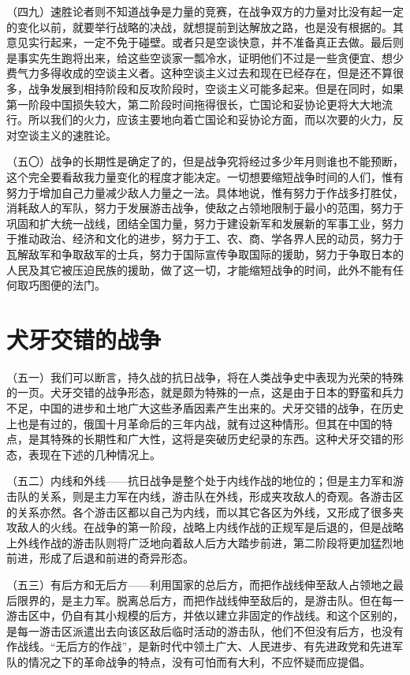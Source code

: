 （四九）速胜论者则不知道战争是力量的竞赛，在战争双方的力量对比没有起一定的变化以前，就要举行战略的决战，就想提前到达解放之路，也是没有根据的。其意见实行起来，一定不免于碰壁。或者只是空谈快意，并不准备真正去做。最后则是事实先生跑将出来，给这些空谈家一瓢冷水，证明他们不过是一些贪便宜、想少费气力多得收成的空谈主义者。这种空谈主义过去和现在已经存在，但是还不算很多，战争发展到相持阶段和反攻阶段时，空谈主义可能多起来。但是在同时，如果第一阶段中国损失较大，第二阶段时间拖得很长，亡国论和妥协论更将大大地流行。所以我们的火力，应该主要地向着亡国论和妥协论方面，而以次要的火力，反对空谈主义的速胜论。

（五〇）战争的长期性是确定了的，但是战争究将经过多少年月则谁也不能预断，这个完全要看敌我力量变化的程度才能决定。一切想要缩短战争时间的人们，惟有努力于增加自己力量减少敌人力量之一法。具体地说，惟有努力于作战多打胜仗，消耗敌人的军队，努力于发展游击战争，使敌之占领地限制于最小的范围，努力于巩固和扩大统一战线，团结全国力量，努力于建设新军和发展新的军事工业，努力于推动政治、经济和文化的进步，努力于工、农、商、学各界人民的动员，努力于瓦解敌军和争取敌军的士兵，努力于国际宣传争取国际的援助，努力于争取日本的人民及其它被压迫民族的援助，做了这一切，才能缩短战争的时间，此外不能有任何取巧图便的法门。

\section{犬牙交错的战争}

（五一）我们可以断言，持久战的抗日战争，将在人类战争史中表现为光荣的特殊的一页。犬牙交错的战争形态，就是颇为特殊的一点，这是由于日本的野蛮和兵力不足，中国的进步和土地广大这些矛盾因素产生出来的。犬牙交错的战争，在历史上也是有过的，俄国十月革命后的三年内战，就有过这种情形。但其在中国的特点，是其特殊的长期性和广大性，这将是突破历史纪录的东西。这种犬牙交错的形态，表现在下述的几种情况上。

（五二）内线和外线——抗日战争是整个处于内线作战的地位的；但是主力军和游击队的关系，则是主力军在内线，游击队在外线，形成夹攻敌人的奇观。各游击区的关系亦然。各个游击区都以自己为内线，而以其它各区为外线，又形成了很多夹攻敌人的火线。在战争的第一阶段，战略上内线作战的正规军是后退的，但是战略上外线作战的游击队则将广泛地向着敌人后方大踏步前进，第二阶段将更加猛烈地前进，形成了后退和前进的奇异形态。

（五三）有后方和无后方——利用国家的总后方，而把作战线伸至敌人占领地之最后限界的，是主力军。脱离总后方，而把作战线伸至敌后的，是游击队。但在每一游击区中，仍自有其小规模的后方，并依以建立非固定的作战线。和这个区别的，是每一游击区派遣出去向该区敌后临时活动的游击队，他们不但没有后方，也没有作战线。“无后方的作战”，是新时代中领土广大、人民进步、有先进政党和先进军队的情况之下的革命战争的特点，没有可怕而有大利，不应怀疑而应提倡。

